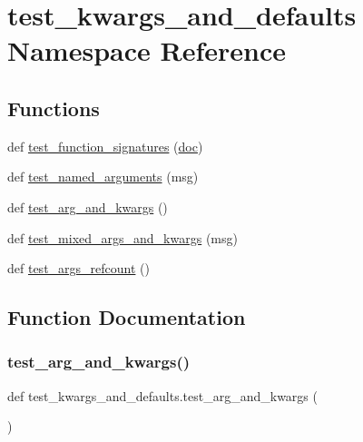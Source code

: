 \hypertarget{namespacetest__kwargs__and__defaults}{}\section{test\+\_\+kwargs\+\_\+and\+\_\+defaults Namespace Reference}
\label{namespacetest__kwargs__and__defaults}
\subsection*{Functions}
\begin{DoxyCompactItemize}
\item 
def \mbox{\hyperlink{namespacetest__kwargs__and__defaults_a7cfcf67c4fce42558562908706957c41}{test\+\_\+function\+\_\+signatures}} (\mbox{\hyperlink{structdoc}{doc}})
\item 
def \mbox{\hyperlink{namespacetest__kwargs__and__defaults_a49b83bdaebd7703150cb6c640d517744}{test\+\_\+named\+\_\+arguments}} (msg)
\item 
def \mbox{\hyperlink{namespacetest__kwargs__and__defaults_aa812b3086ec43a780b2a9bf02dc74ccc}{test\+\_\+arg\+\_\+and\+\_\+kwargs}} ()
\item 
def \mbox{\hyperlink{namespacetest__kwargs__and__defaults_a5158560bc13d6f590c299d7c47007991}{test\+\_\+mixed\+\_\+args\+\_\+and\+\_\+kwargs}} (msg)
\item 
def \mbox{\hyperlink{namespacetest__kwargs__and__defaults_a02205856cafb097a531db7c56a6012da}{test\+\_\+args\+\_\+refcount}} ()
\end{DoxyCompactItemize}


\subsection{Function Documentation}
\mbox{\label{namespacetest__kwargs__and__defaults_aa812b3086ec43a780b2a9bf02dc74ccc}} 
\subsubsection{\texorpdfstring{test\_arg\_and\_kwargs()}{test\_arg\_and\_kwargs()}}
{\footnotesize\ttfamily def test\+\_\+kwargs\+\_\+and\+\_\+defaults.\+test\+\_\+arg\+\_\+and\+\_\+kwargs (\begin{DoxyParamCaption}{ }\end{DoxyParamCaption})}

